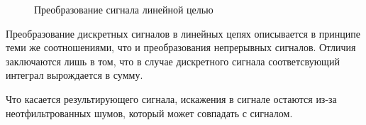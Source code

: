 \documentclass[12pt,a4paper]{scrartcl}
\begin{document}
\begin{figure}[h!]
\caption{Преобразование сигнала линейной целью}
\end{figure}

Преобразование дискретных сигналов в линейных цепях описывается в принципе теми же соотношениями, что и преобразования непрерывных сигналов. Отличия заключаются лишь в том, что в случае дискретного сигнала соответсвующий интеграл вырождается в сумму.

Что касается результирующего сигнала, искажения в сигнале остаются из-за неотфильтрованных шумов, который может совпадать с сигналом.
\end{document}
